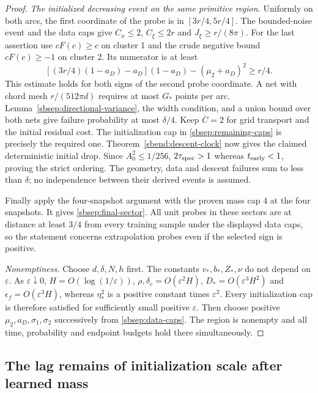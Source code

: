 \documentclass{article} %
\theoremstyle{plain}
\theoremstyle{definition}
\theoremstyle{remark}
\begin{document}
\begin{proof}
\emph{The initialized decreasing event on the same primitive region.}
Uniformly on both arcs, the first coordinate of the probe is in
$[3r/4,5r/4]$. The bounded-noise event and the data caps give
$C_x\le2$, $C_\xi\le2r$ and $J_\xi\ge r/(8\pi)$.
For the last assertion use $cF(c)\ge c$ on cluster 1 and the crude
negative bound $cF(c)\ge-1$ on cluster 2. Its numerator is at least
\[
 [(3r/4)(1-a_D)-a_D](1-a_D)-(\mu_2+a_D)^2\ge r/4.
\]
This estimate holds for both signs of the second probe coordinate.
A net with chord mesh $r/(512\pi d)$ requires at most $G_*$ points
per arc. Lemma~\ref{sbsep:directional-variance}, the width condition,
and a union bound over both nets give failure probability at most
$\delta/4$. Keep $\overline C=2$ for grid transport and the initial
residual cost. The initialization cap in
\eqref{sbsep:remaining-caps} is precisely the required one.
Theorem~\ref{sbend:descent-clock} now gives the claimed deterministic
initial drop. Since $A_0^2\le1/256$, $2\tau_{\rm spec}>1$ whereas
$t_{\rm early}<1$, proving the strict ordering.
The geometry, data and descent failures sum to less than $\delta$;
no independence between their derived events is assumed.

Finally apply the four-snapshot argument with the proven mass cap $4$
at the four snapshots. It gives \eqref{sbsep:final-sector}.
All unit probes in these sectors are at distance at least $3/4$ from
every training sample under the displayed data caps, so the statement
concerns extrapolation probes even if the selected sign is positive.

\emph{Nonemptiness.}
Choose $d,\delta,N,h$ first. The constants $v_*,b_*,Z_*,\nu$ do not
depend on $\varepsilon$. As $\varepsilon\downarrow0$,
$H=O(\log(1/\varepsilon))$, $\rho,\delta_c=O(\varepsilon^2H)$,
$D_*=O(\varepsilon^3H^2)$ and
$\epsilon_f=O(\varepsilon^3H)$, whereas $\eta_*^2$ is a positive
constant times $\varepsilon^2$. Every initialization cap is therefore
satisfied for sufficiently small positive $\varepsilon$. Then choose
positive $\mu_2,a_D,\sigma_1,\sigma_2$ successively from
\eqref{sbsep:data-caps}. The region is nonempty and all time, probability
and endpoint budgets hold there simultaneously.
\end{proof}

\subsection{The lag remains of initialization scale after learned mass}
\end{document}
